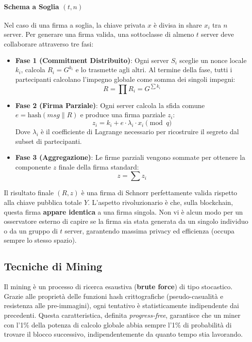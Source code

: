 \paragraph{Schema a Soglia $(t, n)$}
Nel caso di una firma a soglia, la chiave privata $x$ è divisa in share $x_i$ tra $n$ server. Per generare una firma valida, una sottoclasse di almeno $t$ server deve collaborare attraverso tre fasi:


\begin{itemize}
    \item \textbf{Fase 1 (Commitment Distribuito)}: 
    Ogni server $S_i$ sceglie un nonce locale $k_i$, calcola $R_i = G^{k_i}$ e lo trasmette agli altri. Al termine della fase, tutti i partecipanti calcolano l'impegno globale come somma dei singoli impegni:
    \[ R = \prod R_i = G^{\sum k_i} \]
    
    \item \textbf{Fase 2 (Firma Parziale)}: 
    Ogni server calcola la sfida comune $e = \text{hash}(msg \parallel R)$ e produce una firma parziale $z_i$:
    \[ z_i = k_i + e \cdot \lambda_i \cdot x_i \pmod q \]
    Dove $\lambda_i$ è il coefficiente di Lagrange necessario per ricostruire il segreto dal subset di partecipanti.
    
    \item \textbf{Fase 3 (Aggregazione)}: 
    Le firme parziali vengono sommate per ottenere la componente $z$ finale della firma standard:
    \[ z = \sum z_i \]
\end{itemize}

Il risultato finale $(R, z)$ è una firma di Schnorr perfettamente valida rispetto alla chiave pubblica totale $Y$. L'aspetto rivoluzionario è che, sulla blockchain, questa firma \textbf{appare identica} a una firma singola. Non vi è alcun modo per un osservatore esterno di capire se la firma sia stata generata da un singolo individuo o da un gruppo di $t$ server, garantendo massima privacy ed efficienza (occupa sempre lo stesso spazio).


\subsection{Tecniche di Mining}
Il mining è un processo di ricerca esaustiva (\textbf{brute force}) di tipo stocastico. Grazie alle proprietà delle funzioni hash crittografiche (pseudo-casualità e resistenza alle pre-immagini), ogni tentativo è statisticamente indipendente dai precedenti. Questa caratteristica, definita \textit{progress-free}, garantisce che un miner con l'1\% della potenza di calcolo globale abbia sempre l'1\% di probabilità di trovare il blocco successivo, indipendentemente da quanto tempo stia lavorando.


